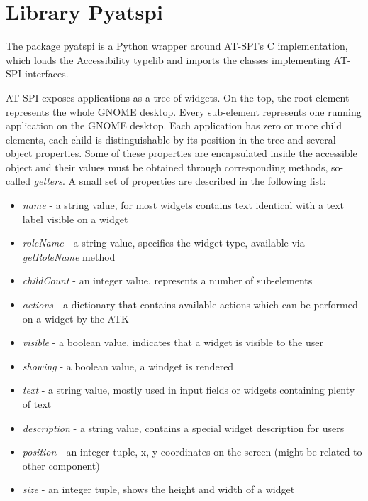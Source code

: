 \newpage
\section{Library Pyatspi}\label{library_pyatspi}
The package pyatspi is a Python wrapper around AT-SPI's C implementation, which loads the Accessibility typelib and imports the classes implementing AT-SPI interfaces.\cite{pyatspi}

AT-SPI exposes applications as a tree of widgets. On the top, the root element represents the whole GNOME desktop. Every sub-element represents one running application on the GNOME desktop. Each application has zero or more child elements, each child is distinguishable by its position in the tree and several object properties. Some of these properties are encapsulated inside the accessible object and their values must be obtained through corresponding methods, so-called \textit{getters}. A small set of properties are described in the following list:
\begin{itemize}
    \item \textit{name} - a string value, for most widgets contains text identical with a text label visible on a widget
    \item \textit{roleName} - a string value, specifies the widget type, available via \textit{getRoleName} method
    \item \textit{childCount} - an integer value, represents a number of sub-elements 
    \item \textit{actions} - a dictionary that contains available actions which can be performed on a widget by the ATK
    \item \textit{visible} - a boolean value, indicates that a widget is visible to the user
    \item \textit{showing} - a boolean value, a windget is rendered
    \item \textit{text} - a string value, mostly used in input fields or widgets containing plenty of text
    \item \textit{description} - a string value, contains a special widget description for users
    \item \textit{position} - an integer tuple, x, y coordinates on the screen (might be related to other component)
    \item \textit{size} - an integer tuple, shows the height and width of a widget
\end{itemize}

